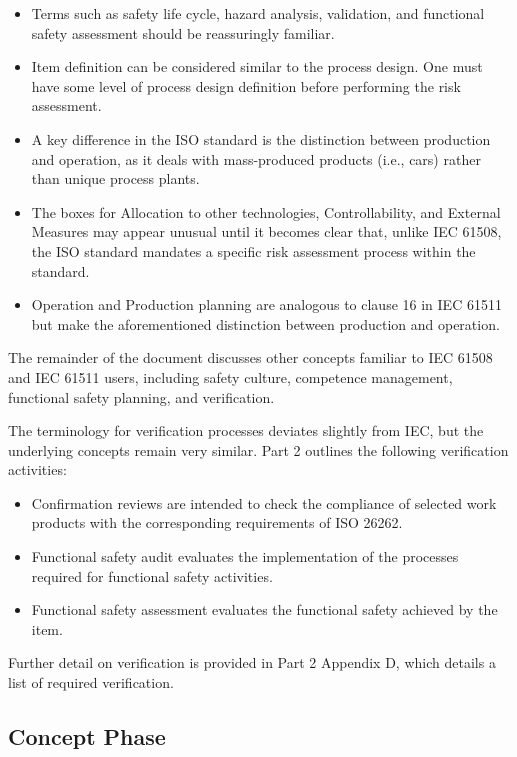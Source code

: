 \documentclass[./dissertation.tex]{subfiles}
\begin{document}
\begin{itemize}
\item Terms such as safety life cycle, hazard analysis, validation, and functional safety assessment should be reassuringly familiar.
\item Item definition can be considered similar to the process design. One must have some level of process design definition before performing the risk assessment.
\item A key difference in the ISO standard is the distinction between production and operation, as it deals with mass-produced products (i.e., cars) rather than unique process plants.
\item The boxes for Allocation to other technologies, Controllability, and External Measures may appear unusual until it becomes clear that, unlike IEC 61508, the ISO standard mandates a specific risk assessment process within the standard.
\item Operation and Production planning are analogous to clause 16 in IEC 61511 but make the aforementioned distinction between production and operation.
\end{itemize}

The remainder of the document discusses other concepts familiar to IEC 61508 and IEC 61511 users, including safety culture, competence management, functional safety planning, and verification.

The terminology for verification processes deviates slightly from IEC, but the underlying concepts remain very similar. Part 2 outlines the following verification activities:

\begin{itemize}
\item Confirmation reviews are intended to check the compliance of selected work products with the corresponding requirements of ISO 26262.
\item Functional safety audit evaluates the implementation of the processes required for functional safety activities.
\item Functional safety assessment evaluates the functional safety achieved by the item.
\end{itemize}

Further detail on verification is provided in Part 2 Appendix D, which details a list of required verification.




\subsection{Concept Phase}
\end{document}

